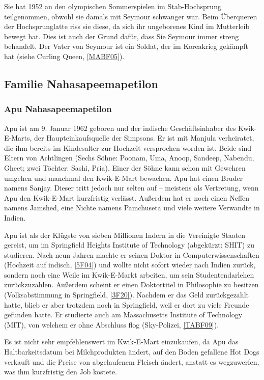 Sie hat 1952 an den olympischen Sommerspielen im Stab-Hochsprung teilgenommen, obwohl sie damals mit Seymour schwanger war. Beim Überqueren der Hochsprunglatte riss sie diese, da sich ihr ungeborenes Kind im Mutterleib bewegt hat. Dies ist auch der Grund dafür, dass Sie Seymour immer streng behandelt. Der Vater von Seymour ist ein Soldat, der im Koreakrieg gekämpft hat (siehe \glqq Curling Queen\grqq , \ref{MABF05}).

\subsection{Familie Nahasapeemapetilon}

\subsubsection{Apu Nahasapeemapetilon}\label{ApuNahasapeemapetilon}
Apu ist am 9. Januar 1962 geboren und der indische Geschäftsinhaber des Kwik-E-Marts, der Haupteinkaufsquelle der Simpsons. Er ist mit Manjula verheiratet, die ihm bereits im Kindesalter zur Hochzeit versprochen worden ist. Beide sind Eltern von Achtlingen (Sechs Söhne: Poonam, Uma, Anoop, Sandeep, Nabendu, Gheet; zwei Töchter: Sashi, Pria). Einer der Söhne kann schon mit Gewehren umgehen und manchmal den Kwik-E-Mart bewachen. Apu hat einen Bruder namens Sanjay. Dieser tritt jedoch nur selten auf -- meistens als Vertretung, wenn Apu den Kwik-E-Mart kurzfristig verlässt. Außerdem hat er noch einen Neffen namens Jamshed, eine Nichte namens Pamchuseta und viele weitere Verwandte in Indien.

Apu ist als der Klügste von sieben Millionen Indern in die Vereinigte Staaten gereist, um im Springfield Heights Institute of Technology (abgekürzt: SHIT) zu studieren. Nach neun Jahren machte er seinen Doktor in Computerwissenschaften (\glqq Hochzeit auf indisch\grqq , \ref{5F04}) und wollte nicht sofort wieder nach Indien zurück, sondern noch eine Weile im Kwik-E-Markt arbeiten, um sein Studentendarlehen zurückzuzahlen. Außerdem scheint er einen Doktortitel in Philosophie zu besitzen (\glqq Volksabstimmung in Springfield\grqq , \ref{3F20}). Nachdem er das Geld zurückgezahlt hatte, blieb er aber trotzdem noch in Springfield, weil er dort zu viele Freunde gefunden hatte. Er studierte auch am Massachusetts Institute of Technology (MIT), von welchem er ohne Abschluss flog (\glqq Sky-Polizei\grqq, \ref{TABF09}).

Es ist nicht sehr empfehlenswert im Kwik-E-Mart einzukaufen, da Apu das Haltbarkeitsdatum bei Milchprodukten ändert, auf den Boden gefallene Hot Dogs verkauft und die Preise von abgelaufenem Fleisch ändert, anstatt es wegzuwerfen, was ihm kurzfristig den Job kostete.

